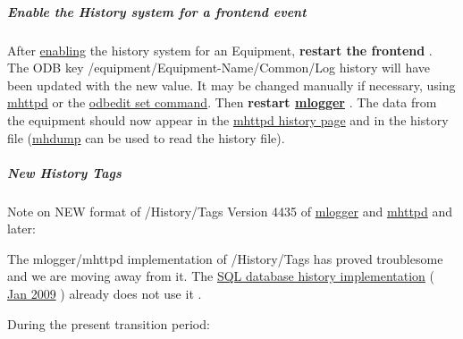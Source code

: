 \label{F_History_logging_idx_history_enable}
\hypertarget{F_History_logging_idx_history_enable}{}
 \hypertarget{F_History_logging_F_Enable_History_Event}{}\subparagraph{Enable the History system for a frontend event}\label{F_History_logging_F_Enable_History_Event}
After \hyperlink{F_History_logging_F_Frontend_History_Event}{enabling} the history system for an Equipment, {\bfseries  restart the frontend }. The ODB key /equipment/Equipment-\/Name/Common/Log history will have been updated with the new value. It may be changed manually if necessary, using \hyperlink{RC_mhttpd_ODB_page}{mhttpd} or the \hyperlink{RC_odbedit_examples_RC_odbedit_set}{odbedit set command}. Then {\bfseries  restart \hyperlink{F_Logging_F_mlogger_utility}{mlogger} } . The data from the equipment should now appear in the \hyperlink{RC_mhttpd_History_page}{mhttpd history page} and in the history file (\hyperlink{F_History_logging_F_mhdump_utility}{mhdump} can be used to read the history file).

\label{F_History_logging_idx_history_tags_new}
\hypertarget{F_History_logging_idx_history_tags_new}{}
 \hypertarget{F_History_logging_F_new_history_tags}{}\subparagraph{New History Tags}\label{F_History_logging_F_new_history_tags}
Note on NEW format of  /History/Tags Version 4435 of \hyperlink{F_Logging_F_mlogger_utility}{mlogger} and \hyperlink{RC_mhttpd_utility}{mhttpd} and later:  \par


The mlogger/mhttpd implementation of /History/Tags has proved troublesome and we are moving away from it. The \hyperlink{F_History_logging_F_History_sql_internal}{SQL database history implementation} ( \hyperlink{NDF_ndf_jan_2009}{Jan 2009} ) already does not use it . \par
During the present transition period:


